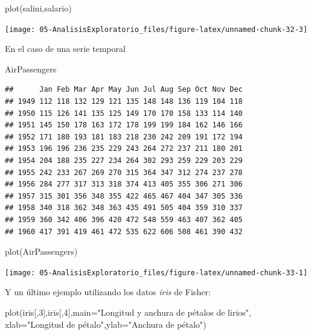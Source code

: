 \documentclass[
]{book}
\newenvironment{Shaded}{\begin{snugshade}}{\end{snugshade}}
\newcommand{\AttributeTok}[1]{\textcolor[rgb]{0.77,0.63,0.00}{#1}}
\newcommand{\DecValTok}[1]{\textcolor[rgb]{0.00,0.00,0.81}{#1}}
\newcommand{\FunctionTok}[1]{\textcolor[rgb]{0.00,0.00,0.00}{#1}}
\newcommand{\NormalTok}[1]{#1}
\newcommand{\StringTok}[1]{\textcolor[rgb]{0.31,0.60,0.02}{#1}}
\theoremstyle{break}
\begin{document}
\begin{Shaded}
\begin{Highlighting}[]
\FunctionTok{plot}\NormalTok{(salini,salario)}
\end{Highlighting}
\end{Shaded}

\begin{center}\texttt{[image: 05-AnalisisExploratorio\_files/figure-latex/unnamed-chunk-32-3]} \end{center}

En el caso de una serie temporal

\begin{Shaded}
\begin{Highlighting}[]
\NormalTok{AirPassengers}
\end{Highlighting}
\end{Shaded}

\begin{verbatim}
##      Jan Feb Mar Apr May Jun Jul Aug Sep Oct Nov Dec
## 1949 112 118 132 129 121 135 148 148 136 119 104 118
## 1950 115 126 141 135 125 149 170 170 158 133 114 140
## 1951 145 150 178 163 172 178 199 199 184 162 146 166
## 1952 171 180 193 181 183 218 230 242 209 191 172 194
## 1953 196 196 236 235 229 243 264 272 237 211 180 201
## 1954 204 188 235 227 234 264 302 293 259 229 203 229
## 1955 242 233 267 269 270 315 364 347 312 274 237 278
## 1956 284 277 317 313 318 374 413 405 355 306 271 306
## 1957 315 301 356 348 355 422 465 467 404 347 305 336
## 1958 340 318 362 348 363 435 491 505 404 359 310 337
## 1959 360 342 406 396 420 472 548 559 463 407 362 405
## 1960 417 391 419 461 472 535 622 606 508 461 390 432
\end{verbatim}

\begin{Shaded}
\begin{Highlighting}[]
\FunctionTok{plot}\NormalTok{(AirPassengers)}
\end{Highlighting}
\end{Shaded}

\begin{center}\texttt{[image: 05-AnalisisExploratorio\_files/figure-latex/unnamed-chunk-33-1]} \end{center}

Y un último ejemplo utilizando los datos \emph{iris} de Fisher:

\begin{Shaded}
\begin{Highlighting}[]
\FunctionTok{plot}\NormalTok{(iris[,}\DecValTok{3}\NormalTok{],iris[,}\DecValTok{4}\NormalTok{],}\AttributeTok{main=}\StringTok{"Longitud y anchura de pétalos de lirios"}\NormalTok{,}
     \AttributeTok{xlab=}\StringTok{"Longitud de pétalo"}\NormalTok{,}\AttributeTok{ylab=}\StringTok{"Anchura de pétalo"}\NormalTok{)}
\end{Highlighting}
\end{Shaded}
\end{document}

